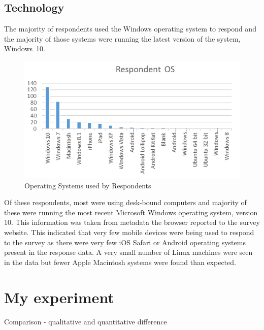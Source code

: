 \subsection{Technology}
The majority of respondents used the Windows operating system to respond and the majority of those systems were running the latest version of the system, Windows~10. 
\begin{figure}
\centering
\includegraphics[scale=1]{figures/Survey-OS.png} 
\caption{Operating Systems used by Respondents}
\label{fig:surveyOS}
\end{figure}
Of these respondents, most were using desk-bound computers and majority of these were running the most recent Microsoft Windows operating system, version 10. This information was taken from metadata the browser reported to the survey website. This indicated that very few mobile devices were being used to respond to the survey as there were very few iOS Safari or Android operating systems present in the response data. A very small number of Linux machines were seen in the data but fewer Apple Macintosh systems were found than expected. 


\section{My experiment}
Comparison - qualitative and quantitative difference
\label{fig:GenericExample}


